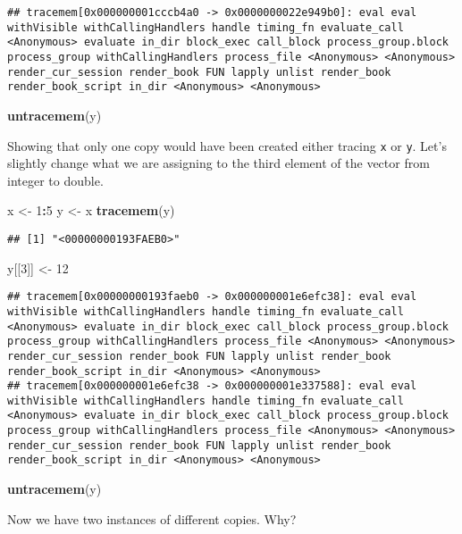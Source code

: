 \documentclass[]{book}
\newenvironment{Shaded}{\begin{snugshade}}{\end{snugshade}}
\newcommand{\DecValTok}[1]{\textcolor[rgb]{0.00,0.00,0.81}{#1}}
\newcommand{\KeywordTok}[1]{\textcolor[rgb]{0.13,0.29,0.53}{\textbf{#1}}}
\newcommand{\NormalTok}[1]{#1}
\newcommand{\OperatorTok}[1]{\textcolor[rgb]{0.81,0.36,0.00}{\textbf{#1}}}
\newcommand{\StringTok}[1]{\textcolor[rgb]{0.31,0.60,0.02}{#1}}
\begin{document}
\begin{verbatim}
## tracemem[0x000000001cccb4a0 -> 0x0000000022e949b0]: eval eval withVisible withCallingHandlers handle timing_fn evaluate_call <Anonymous> evaluate in_dir block_exec call_block process_group.block process_group withCallingHandlers process_file <Anonymous> <Anonymous> render_cur_session render_book FUN lapply unlist render_book render_book_script in_dir <Anonymous> <Anonymous>
\end{verbatim}

\begin{Shaded}
\begin{Highlighting}[]
\KeywordTok{untracemem}\NormalTok{(y)}
\end{Highlighting}
\end{Shaded}

Showing that only one copy would have been created either tracing \texttt{x} or \texttt{y}. Let's slightly change what we are assigning to the third element of the vector from integer to double.

\begin{Shaded}
\begin{Highlighting}[]
\NormalTok{x <-}\StringTok{ }\DecValTok{1}\OperatorTok{:}\DecValTok{5}
\NormalTok{y <-}\StringTok{ }\NormalTok{x}
\KeywordTok{tracemem}\NormalTok{(y)}
\end{Highlighting}
\end{Shaded}

\begin{verbatim}
## [1] "<00000000193FAEB0>"
\end{verbatim}

\begin{Shaded}
\begin{Highlighting}[]
\NormalTok{y[[}\DecValTok{3}\NormalTok{]] <-}\StringTok{ }\DecValTok{12}
\end{Highlighting}
\end{Shaded}

\begin{verbatim}
## tracemem[0x00000000193faeb0 -> 0x000000001e6efc38]: eval eval withVisible withCallingHandlers handle timing_fn evaluate_call <Anonymous> evaluate in_dir block_exec call_block process_group.block process_group withCallingHandlers process_file <Anonymous> <Anonymous> render_cur_session render_book FUN lapply unlist render_book render_book_script in_dir <Anonymous> <Anonymous> 
## tracemem[0x000000001e6efc38 -> 0x000000001e337588]: eval eval withVisible withCallingHandlers handle timing_fn evaluate_call <Anonymous> evaluate in_dir block_exec call_block process_group.block process_group withCallingHandlers process_file <Anonymous> <Anonymous> render_cur_session render_book FUN lapply unlist render_book render_book_script in_dir <Anonymous> <Anonymous>
\end{verbatim}

\begin{Shaded}
\begin{Highlighting}[]
\KeywordTok{untracemem}\NormalTok{(y)}
\end{Highlighting}
\end{Shaded}

Now we have two instances of different copies. Why?
\end{document}
